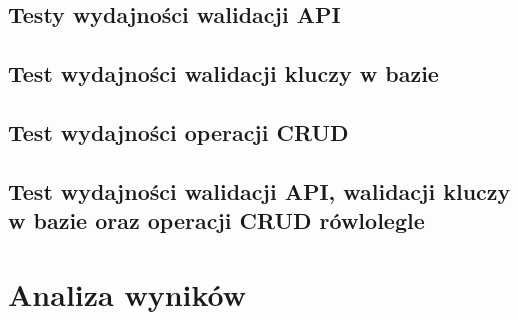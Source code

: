 \subsection{Testy wydajności walidacji API}


\clearpage

\newpage
\subsection{Test wydajności walidacji kluczy w bazie}


\clearpage

\newpage
\subsection{Test wydajności operacji CRUD}


\clearpage


\newpage
\subsection{Test wydajności walidacji API, walidacji kluczy w bazie oraz operacji CRUD rówlolegle }


\clearpage

\newpage
\section{Analiza wyników}
